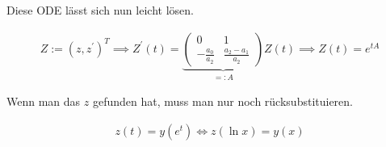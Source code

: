 \begin{solution}
Diese ODE lässt sich nun leicht lösen.

\begin{align*}
    Z := (z, z^\prime)^T
    \implies
    Z^\prime(t)
    =
    \underbrace
    {
        \begin{pmatrix}
            0                & 1 \\
            -\frac{a_0}{a_2} & \frac{a_2 - a_1}{a_2}
        \end{pmatrix}
    }_{=: A}
    Z(t)
    \implies
    Z(t) = e^{tA}
\end{align*}

Wenn man das $z$ gefunden hat, muss man nur noch rücksubstituieren.

\begin{align*}
    z(t) = y(e^t)
    \iff
    z(\ln{x}) = y(x)
\end{align*}

\end{solution}

